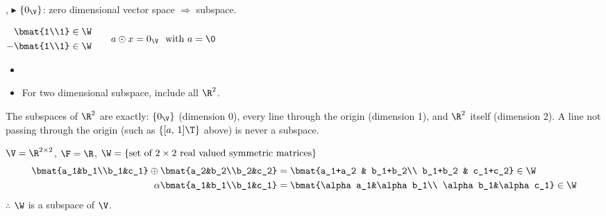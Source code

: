 \sep
$\blacktriangleright$ $\{0_{\V}\}$: zero dimensional vector space $\Rightarrow$ subspace.

\begin{center}
\qquad
$\begin{aligned}
\bmat{1\\1}&\in\W\\
-\bmat{1\\1}&\in\W
\end{aligned}
\qquad
a\odot x = 0_{\V} \ \text{ with } a=\0$
\end{center}
\begin{itemize}[label=$\Rightarrow$,nosep]
\item {}
\item For two dimensional subspace, include all $\R^2$.
\end{itemize}
\begin{insight}[Subspaces of $\R^2$]
The subspaces of $\R^2$ are exactly: $\{0_{\V}\}$ (dimension 0), every line through the origin (dimension 1), and $\R^2$ itself (dimension 2). A line not passing through the origin (such as $\{[a,\,1]\T\}$ above) is never a subspace.
\end{insight}

\begin{example}
$\V=\R^{2\times2}$, $\F=\R$, \quad $\W = \{\text{set of $2\times2$ real valued symmetric matrices}\}$
\begin{align*}
\bmat{a_1&b_1\\b_1&c_1}\oplus\bmat{a_2&b_2\\b_2&c_2} &= \bmat{a_1+a_2 & b_1+b_2\\ b_1+b_2 & c_1+c_2}\in\W\\
\alpha\bmat{a_1&b_1\\b_1&c_1} &= \bmat{\alpha a_1&\alpha b_1\\ \alpha b_1&\alpha c_1}\in\W
\end{align*}
$\therefore$ $\W$ is a subspace of $\V$.
\end{example}

